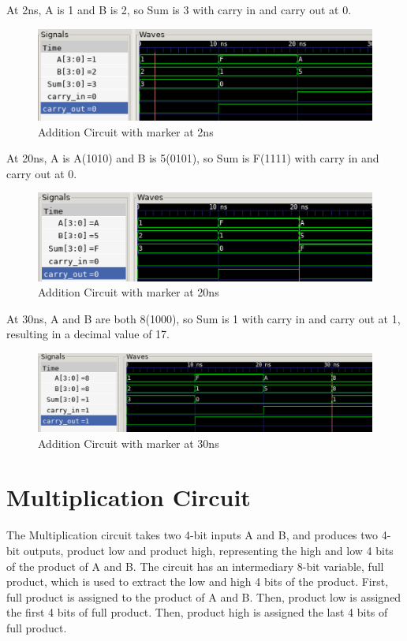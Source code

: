 \documentclass[12pt]{article}
\begin{document}
At 2ns, A is 1 and B is 2, so Sum is 3 with  carry in and carry out at 0.

\begin{figure}[H]
 \centering
 \includegraphics[width = 1.0\textwidth]{Addition/addition_wave.png}
 \caption{Addition Circuit with marker at 2ns}
 \label{fig:enter-label} 
\end{figure} 

At 20ns, A is A(1010) and B is 5(0101), so Sum is F(1111) with carry in and carry out at 0.
 \begin{figure}[H]
 \centering 
\includegraphics[width = 1.0\textwidth]{Addition/addition_wave1.png}
 \caption{Addition Circuit with marker at 20ns}
 \label{fig:enter-label}
 \end{figure}

 At 30ns, A and B are both 8(1000), so Sum is 1 with carry in and carry out at 1, resulting in a decimal value of 17.
 \begin{figure}[H]
 \centering 
\includegraphics[width = 1.0\textwidth]{Addition/addition_wave2.png}
 \caption{Addition Circuit with marker at 30ns}
 \label{fig:enter-label}
 \end{figure}

\section{Multiplication Circuit}
The Multiplication circuit takes two 4-bit inputs A and B, and produces two 4-bit outputs, product low and product high, representing the high and low 4 bits of the product of A and B. The circuit has an intermediary 8-bit variable, full product, which is used to extract the low and high 4 bits of the product. First, full product is assigned to the product of A and B. Then, product low is assigned the first 4 bits of full product. Then, product high is assigned the last 4 bits of full product. 
 
\end{document}
